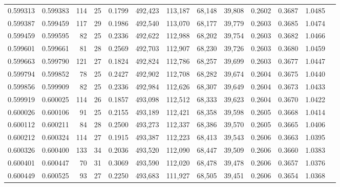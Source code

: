 \begin{tabular}{rrrrrrrrrrrrr}
0.599313 & 0.599383 & 114 &  25 &                                     0.1799 & 492,423 & 113,187 &  68,148 &  39,808 & 0.2602 & 0.3687 & 1.0485 \\
0.599387 & 0.599459 & 117 &  29 &                                     0.1986 & 492,540 & 113,070 &  68,177 &  39,779 & 0.2603 & 0.3685 & 1.0474 \\
0.599459 & 0.599595 &  82 &  25 &                                     0.2336 & 492,622 & 112,988 &  68,202 &  39,754 & 0.2603 & 0.3682 & 1.0466 \\
0.599601 & 0.599661 &  81 &  28 &                                     0.2569 & 492,703 & 112,907 &  68,230 &  39,726 & 0.2603 & 0.3680 & 1.0459 \\
0.599663 & 0.599790 & 121 &  27 &                                     0.1824 & 492,824 & 112,786 &  68,257 &  39,699 & 0.2603 & 0.3677 & 1.0447 \\
0.599794 & 0.599852 &  78 &  25 &                                     0.2427 & 492,902 & 112,708 &  68,282 &  39,674 & 0.2604 & 0.3675 & 1.0440 \\
0.599856 & 0.599909 &  82 &  25 &                                     0.2336 & 492,984 & 112,626 &  68,307 &  39,649 & 0.2604 & 0.3673 & 1.0433 \\
0.599919 & 0.600025 & 114 &  26 &                                     0.1857 & 493,098 & 112,512 &  68,333 &  39,623 & 0.2604 & 0.3670 & 1.0422 \\
0.600026 & 0.600106 &  91 &  25 &                                     0.2155 & 493,189 & 112,421 &  68,358 &  39,598 & 0.2605 & 0.3668 & 1.0414 \\
0.600112 & 0.600211 &  84 &  28 &                                     0.2500 & 493,273 & 112,337 &  68,386 &  39,570 & 0.2605 & 0.3665 & 1.0406 \\
0.600212 & 0.600324 & 114 &  27 &                                     0.1915 & 493,387 & 112,223 &  68,413 &  39,543 & 0.2606 & 0.3663 & 1.0395 \\
0.600326 & 0.600400 & 133 &  34 &                                     0.2036 & 493,520 & 112,090 &  68,447 &  39,509 & 0.2606 & 0.3660 & 1.0383 \\
0.600401 & 0.600447 &  70 &  31 &                                     0.3069 & 493,590 & 112,020 &  68,478 &  39,478 & 0.2606 & 0.3657 & 1.0376 \\
0.600449 & 0.600525 &  93 &  27 &                                     0.2250 & 493,683 & 111,927 &  68,505 &  39,451 & 0.2606 & 0.3654 & 1.0368 \\

\end{tabular}
